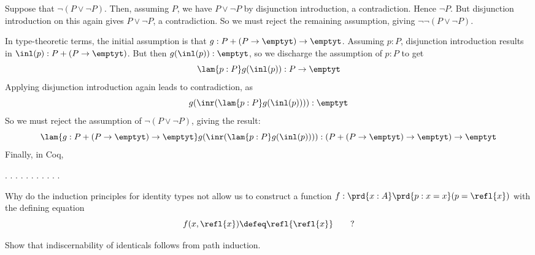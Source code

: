 \soln  
Suppose that $\lnot(P \lor \lnot P)$.  Then, assuming $P$, we have
$P \lor \lnot P$ by disjunction introduction, a contradiction.  Hence
$\lnot P$.  But disjunction introduction on this again gives $P \lor \lnot P$,
a contradiction.  So we must reject the remaining assumption, giving
$\lnot\lnot(P \lor \lnot P)$.


In type-theoretic terms, the initial assumption is that $g : P + (P \to
\emptyt) \to \emptyt$.  Assuming $p : P$, disjunction introduction results in
$\inl(p) : P + (P \to \emptyt)$.  But then $g(\inl(p)) : \emptyt$, so we
discharge the assumption of $p : P$ to get
\[
  \lam{p:P}g(\inl(p)) : P \to \emptyt
\]
Applying disjunction introduction again leads to contradiction, as
\[
  g(\inr(\lam{p:P}g(\inl(p)))) : \emptyt
\]
So we must reject the assumption of $\lnot( P \lor \lnot P)$, giving the
result:
\[
  \lam{g:P + (P \to \emptyt) \to \emptyt}g(\inr(\lam{p:P}g(\inl(p)))) 
  : 
  (P + (P \to \emptyt) \to \emptyt) \to \emptyt
\]
Finally, in Coq, \begin{coqdoccode}
\coqdocemptyline
\coqdocindent{1.00em}
 \coqdocnotation{\ensuremath{\lnot}} \coqdocnotation{\ensuremath{\lnot}} \coqdocnotation{(}  \coqdocnotation{\ensuremath{\lnot}}\coqdocnotation{)}.\coqdoceol
\coqdocindent{1.00em}
.\coqdoceol
\coqdocindent{2.00em}
 .\coqdoceol
\coqdocindent{2.00em}
 .\coqdoceol
\coqdocindent{2.00em}
 .\coqdoceol
\coqdocindent{2.00em}
.\coqdoceol
\coqdocindent{2.00em}
 .\coqdoceol
\coqdocindent{2.00em}
 .\coqdoceol
\coqdocindent{2.00em}
.\coqdoceol
\coqdocindent{2.00em}
 .\coqdoceol
\coqdocindent{1.00em}
.\coqdoceol
\coqdocemptyline
\coqdocemptyline
\end{coqdoccode}


Why do the induction principles for identity types not allow
us to construct a function $f : \prd{x:A}\prd{p:x=x}(p = \refl{x})$ with the
defining equation
\[
  f(x, \refl{x}) \defeq \refl{\refl{x}}\qquad?
\] 

 \soln
\begin{coqdoccode}
\coqdocemptyline
\end{coqdoccode}
Show that indiscernability of identicals follows from path induction.

